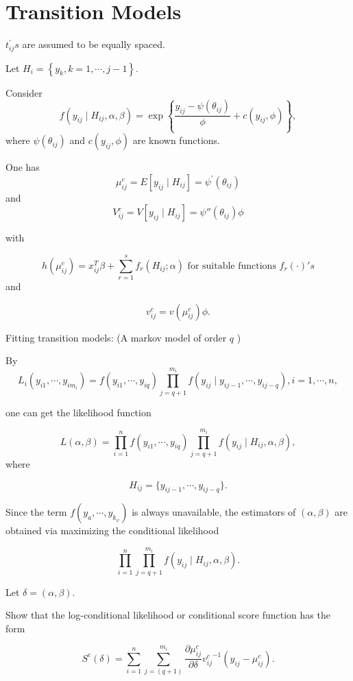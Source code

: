 \documentclass[UTF8,a4paper,10pt]{article}
\begin{document}





\section*{Transition Models}

$t_{ij}^{\prime} s$ are assumed to be equally spaced.


Let $H_i=\left\{y_k, k=1, \cdots, j-1\right\}$. 

Consider \[f(y_{ij}\mid H_{ij},\alpha,\beta) = \exp\left\{\frac{y_{ij}-\psi(\theta_{ij})}{\phi}+c(y_{ij},\phi)\right\},\] where \(\psi(\theta_{ij})\) and \(c(y_{ij},\phi)\) are known functions. 

One has 
$$\mu_{ij}^c=E\left[y_{ij} \mid H_{ij}\right]=\psi^{\prime}\left(\theta_{ij}\right)$$ 
and 
$$V_{ij}^c=V\left[y_{ij} \mid H_{ij}\right]=\psi''\left(\theta_{ij}\right) \phi$$ 

with

\[h(\mu_{ij}^c) = x_{ij}^T\beta +\sum_{r=1}^{s}f_r(H_{ij};\alpha)\text{ for suitable functions }f_r(\cdot)'s\]
and

\[v_{ij}^c = v(\mu_{ij}^c)\phi.\]


\begin{Problem}[]{Fitting transition models: (A markov model of order $q$ )}


 

By
\[L_i(y_{i1},\cdots,y_{im_i}) = f(y_{i1},\cdots,y_{iq})\prod_{j=q+1}^{m_i}f(y_{ij}\mid y_{i j-1},\cdots,y_{i j-q}), i = 1,\cdots,n,\]

one can get the likelihood function 

\[L(\alpha,\beta) = \prod_{i=1}^{n}f(y_{i1},\cdots,y_{iq})\prod_{j=q+1}^{m_i}f(y_{ij}\mid H_{ij},\alpha,\beta),\]
where 

\[H_{ij} = \{y_{i j-1},\cdots,y_{i j-q}\}.\]

Since the term $f\left(y_a, \cdots, y_{k_\psi}\right)$ is always unavailable, the estimators of $(\alpha, \beta)$ are obtained via maximizing the conditional likelihood 

$$\prod_{i=1}^{n} \prod_{j=q+1}^{m_i} f\left(y_{ij}\mid H_{ij}, \alpha, \beta\right).$$

Let $\delta=(\alpha, \beta)$.

Show that the log-conditional likelihood or conditional score function has the form

\[S^c(\delta) = \sum_{i=1}^{n}\sum_{j = (q+1)}^{m_i}\frac{\partial \mu_{ij}^c}{\partial \delta}{v_{ij}^c}^{-1}(y_{ij}-\mu_{ij}^c).\]

\end{Problem}
\end{document}
